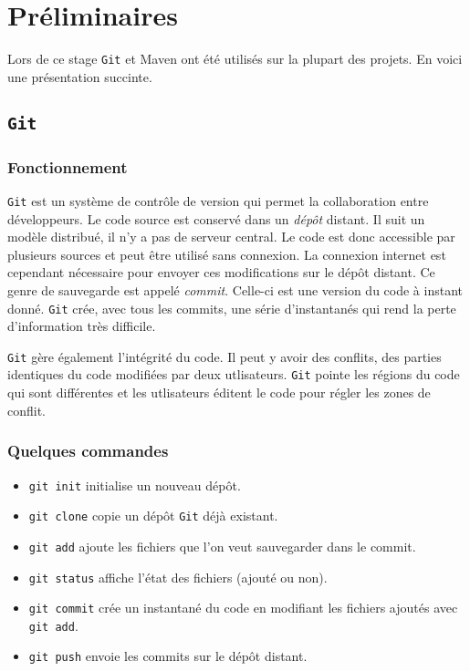 \chapter*{Préliminaires}
Lors de ce stage \texttt{Git} et Maven ont été utilisés sur la plupart des projets. En voici une présentation succinte.
\section*{\texttt{Git}}
\subsection*{Fonctionnement}
\texttt{Git} est un système de contrôle de version qui permet la collaboration entre développeurs. Le code source est conservé dans un \textit{dépôt} distant. Il suit un modèle distribué, il n'y a pas de serveur central. Le code est donc accessible par plusieurs sources et peut être utilisé sans connexion. La connexion internet est cependant nécessaire pour envoyer ces modifications sur le dépôt distant. Ce genre de sauvegarde est appelé \textit{commit}. Celle-ci est une version du code à instant donné. \texttt{Git} crée, avec tous les commits, une série d’instantanés qui rend la perte d'information très difficile. 

\texttt{Git} gère également l'intégrité du code. Il peut y avoir des conflits, des parties identiques du code modifiées par deux utlisateurs. \texttt{Git} pointe les régions du code qui sont différentes et les utlisateurs éditent le code pour régler les zones de conflit.

\subsection*{Quelques commandes}

\begin{itemize}
    \item \texttt{git init} initialise un nouveau dépôt.
    \item \texttt{git clone} copie un dépôt \texttt{Git} déjà existant.
    \item \texttt{git add} ajoute les fichiers que l'on veut sauvegarder dans le commit.
    \item \texttt{git status} affiche l'état des fichiers (ajouté ou non).
    \item \texttt{git commit} crée un instantané du code en modifiant les fichiers ajoutés avec \texttt{git add}.
    \item \texttt{git push} envoie les commits sur le dépôt distant.
\end{itemize}

